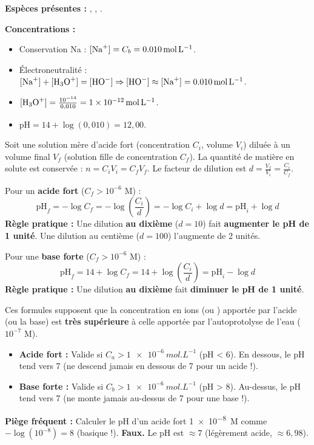 \documentclass[11pt]{article}
\newcounter{popsec}
\newcounter{popsub}
\newcommand{\courssub}[1]{%
  \stepcounter{popsub}%
  \par\vspace{9pt}\noindent{\popxbold\fontsize{11.5}{13}\selectfont\color{popink}{\color{poporange}\thepopsec.\thepopsub}\hspace{6pt}#1}\par\nopagebreak\vspace{4pt}
}
\begin{document}
\begin{exemplebox}
\textbf{Espèces présentes :} , , .
\par
\textbf{Concentrations :}
\begin{itemize}
  \item Conservation Na : $[\ce{Na+}] = C_b = \SI{0,010}{mol.L^{-1}}$.
  \item Électroneutralité : $[\ce{Na+}] + [\ce{H3O+}] = [\ce{HO-}] \Rightarrow [\ce{HO-}] \approx [\ce{Na+}] = \SI{0,010}{mol.L^{-1}}$.
  \item $[\ce{H3O+}] = \frac{10^{-14}}{0,010} = \SI{1e-12}{mol.L^{-1}}$.
  \item $\mathrm{pH} = 14 + \log(0,010) = 12,00$.
\end{itemize}
\end{exemplebox}

\courssub{Effet de la dilution sur le pH}

\begin{propriete}
Soit une solution mère d'acide fort (concentration $C_i$, volume $V_i$) diluée à un volume final $V_f$ (solution fille de concentration $C_f$).
La quantité de matière en solute est conservée : $n = C_i V_i = C_f V_f$.
Le facteur de dilution est $d = \frac{V_f}{V_i} = \frac{C_i}{C_f}$.
\par
Pour un \textbf{acide fort} ($C_f > 10^{-6}$ M) :
\[ \mathrm{pH}_f = -\log C_f = -\log \left( \frac{C_i}{d} \right) = -\log C_i + \log d = \mathrm{pH}_i + \log d \]
\textbf{Règle pratique :} Une dilution \textbf{au dixième} ($d=10$) fait \textbf{augmenter le pH de 1 unité}. Une dilution au centième ($d=100$) l'augmente de 2 unités.
\par
Pour une \textbf{base forte} ($C_f > 10^{-6}$ M) :
\[ \mathrm{pH}_f = 14 + \log C_f = 14 + \log \left( \frac{C_i}{d} \right) = \mathrm{pH}_i - \log d \]
\textbf{Règle pratique :} Une dilution \textbf{au dixième} fait \textbf{diminuer le pH de 1 unité}.
\end{propriete}

\begin{attention}[Limites de validité des formules $\mathrm{pH} = -\log C$ et $\mathrm{pH} = 14 + \log C$]
Ces formules supposent que la concentration en ions  (ou ) apportée par l'acide (ou la base) est \textbf{très supérieure} à celle apportée par l'autoprotolyse de l'eau ($10^{-7}$ M).
\begin{itemize}
  \item \textbf{Acide fort :} Valide si $C_a > \SI{1e-6}{mol.L^{-1}}$ (pH < 6). En dessous, le pH tend vers 7 (ne descend jamais en dessous de 7 pour un acide !).
  \item \textbf{Base forte :} Valide si $C_b > \SI{1e-6}{mol.L^{-1}}$ (pH > 8). Au-dessus, le pH tend vers 7 (ne monte jamais au-dessus de 7 pour une base !).
\end{itemize}
\textbf{Piège fréquent :} Calculer le pH d'un acide fort \SI{1e-8}{M} comme $-\log(10^{-8}) = 8$ (basique !). \textbf{Faux.} Le pH est $\approx 7$ (légèrement acide, $\approx 6,98$).
\end{attention}
\end{document}
